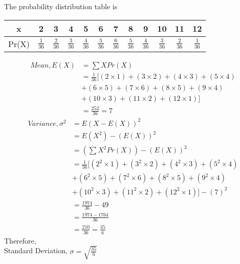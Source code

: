 \documentclass[journal,12pt,twocolumn]{IEEEtran}
\begin{document}
The probability distribution table is 
\begin{table}[hbt!]
\begin{tabular}{|l|c|c|c|c|c|c|c|c|c|c|c|}
\hline
\multicolumn{1}{|c|}{x} & 2 & 3 & 4 & 5 & 6 & 7 & 8 & 9 & 10 & 11 & 12 \\ \hline
Pr(X)                    &$\frac{1}{36}$   &$\frac{2}{36}$   &$\frac{3}{36}$   &$\frac{4}{36}$   &$\frac{5}{36}$   &$\frac{6}{36}$   &$\frac{5}{36}$   &$\frac{4}{36}$   &$\frac{3}{36}$    &$\frac{2}{36}$    &$\frac{1}{36}$    \\ \hline
\end{tabular}
\end{table}
\begin{align*}
    Mean,E(X)& =\sum XPr(X)\\
    & = \displaystyle\frac{1}{36}[(2\times1)+(3\times2)+(4\times3)+(5\times4)\\
    &+(6\times5)+(7\times6)+(8\times5)+(9\times4)\\
    &+(10\times3)+(11\times2)+(12\times1)]\\
    & = \frac{252}{36}=7
\end{align*}
\begin{align*}
    Variance, \sigma^2 &= E(X-E(X))^2\\
    &= E(X^2) - (E(X))^2\\
    &= \left(\sum X^2Pr(X)\right) - (E(X))^2\\
    & = \displaystyle\frac{1}{36}[(2^2\times1)+(3^2\times2)+(4^2\times3)+(5^2\times4)\\
    &+(6^2\times5)+(7^2\times6)+(8^2\times5)+(9^2\times4)\\
    &+(10^2\times3)+(11^2\times2)+(12^2\times1)] - (7)^2\\
    &= \displaystyle\frac{1974}{36} - 49\\
    &= \displaystyle\frac{1974-1764}{36}\\
    &= \displaystyle\frac{210}{36} = \frac{35}{6}
\end{align*}
Therefore,\\
Standard Deviation, $\sigma= \displaystyle\sqrt{\frac{35}{6}}$
\end{document}
